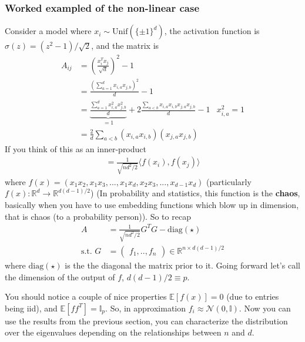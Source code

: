 \subsubsection{Worked exampled of the non-linear case}
Consider a model where $x_i \sim \text{Unif}(\{\pm 1\}^d)$, the activation function is  $\sigma(z) = (z^2 - 1) / \sqrt{2}$, and the matrix is
\begin{align}
	A_{ij} & = \left( \frac{x_i^T x_j}{\sqrt{d}}\right)^2 - 1\\
	& = \frac{(\sum_{a=1}^d x_{i,a} x_{j,b})^2}{d} - 1\\
	& = \underbrace{\frac{\sum_{a=1}^d x_{i,a}^2 x_{j,b}^2}{d}}_{=1} + 2 \frac{\sum_{a < b} x_{i,a}x_{i,b}x_{j,a}x_{j,b} }{d} - 1 & x_{i,a}^2 = 1\\
	& = \frac{2}{d} \sum_{a < b} (x_{i,a} x_{i,b}) (x_{j,a} x_{j,b})
\end{align}
If you think of this as an inner-product
\begin{align}
	= \frac{1}{\sqrt{n d^2 / 2}} \langle f(x_i), f(x_j)\rangle 
\end{align}
where $f(x) = (x_1 x_2, x_1 x_3, ..., x_1 x_d, x_2 x_3, ..., x_{d-1} x_d)$ (particularly $f(x) : \mathbb R^d \to \mathbb R^{d(d-1)/2}$) (In probability and statistics, this function is the \textbf{chaos}, basically when you have to use embedding functions which blow up in dimension, that is chaos (to a probability person)). So to recap
\begin{align}
	A & = \frac{1}{\sqrt{n d^2 /2}} G^T G - \text{diag}(\star)\\
	\text{s.t. }G & = \begin{pmatrix}
		f_1 , .., f_n
	\end{pmatrix} \in \mathbb R^{n \times d(d-1)/2}
\end{align}
where $\text{diag}(\star)$ is the the diagonal the matrix prior to it. Going forward let's call the dimension of the output of $f$, $d(d-1)/2 \equiv p$. 

You should notice a couple of nice properties $\mathbb E[f(x)] = 0$ (due to entries being iid), and $\mathbb E[ff^T] = \mathbb I_p$. So, in approximation $f_i \approx \mathcal N(0, \mathbb I)$.  Now you can use the results from the previous section, you can characterize the distribution over the eigenvalues depending on the relationships between $n$ and $d$.
